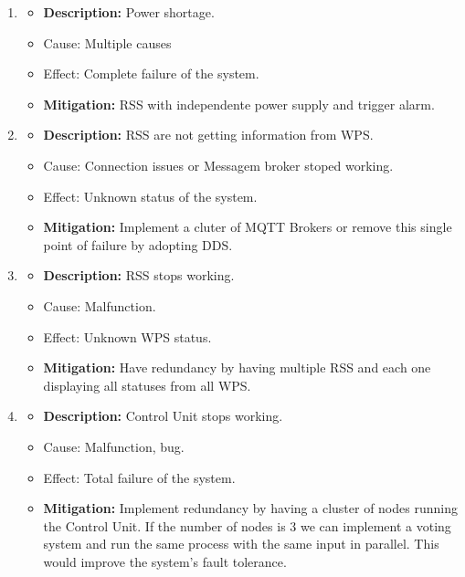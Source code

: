 \documentclass[11pt]{article}
\begin{document}
\begin{enumerate}[leftmargin=4em, font=\small, label=\textbf{H-\arabic*:}]
\begin{itemize}
		\end{itemize}
	\item 
		\begin{itemize}
		\setlength\itemsep{0em}
    		\item \textbf{Description:} Power shortage.
			\item Cause: Multiple causes
    		\item Effect: Complete failure of the system.
    		\item \textbf{Mitigation:} RSS with independente power supply and trigger alarm.
		\end{itemize} 
	\item 
		\begin{itemize}
		\setlength\itemsep{0em}
    		\item \textbf{Description:} RSS are not getting information from WPS.
			\item Cause: Connection issues or Messagem broker stoped working.
    		\item Effect: Unknown status of the system.
    		\item \textbf{Mitigation:} Implement a cluter of MQTT Brokers or remove this single point of failure by adopting DDS.
		\end{itemize} 
	\item 
		\begin{itemize}
		\setlength\itemsep{0em}
    		\item \textbf{Description:} RSS stops working.
			\item Cause: Malfunction.
    		\item Effect: Unknown WPS status.
    		\item \textbf{Mitigation:} Have redundancy by having multiple RSS and each one displaying all statuses from all WPS.
		\end{itemize} 
	\item 
		\begin{itemize}
		\setlength\itemsep{0em}
    		\item \textbf{Description:} Control Unit stops working.
			\item Cause: Malfunction, bug.
    		\item Effect: Total failure of the system.
    		\item \textbf{Mitigation:} Implement redundancy by having a cluster of nodes running the Control Unit. If the number of nodes is 3 we can implement a voting system and run the same process with the same input in parallel. This would improve the system's fault tolerance.
		\end{itemize} 
\end{enumerate}
\end{document}
